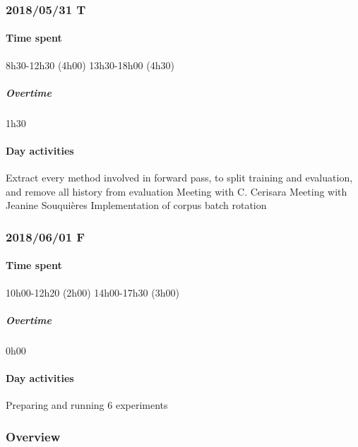 \subsubsection{2018/05/31 T}
\paragraph{Time spent}
{8h30}-{12h30} (4h00)
{13h30}-{18h00} (4h30) 

\subparagraph{Overtime}
1h30

\paragraph{Day activities}
Extract every method involved in forward pass, to split training and evaluation, and remove all history from evaluation
Meeting with C. Cerisara
Meeting with Jeanine Souquières
Implementation of corpus batch rotation

\subsubsection{2018/06/01 F}
\paragraph{Time spent}
{10h00}-{12h20} (2h00)
{14h00}-{17h30} (3h00) 

\subparagraph{Overtime}
0h00

\paragraph{Day activities}
Preparing and running 6 experiments

\subsubsection{Overview}
